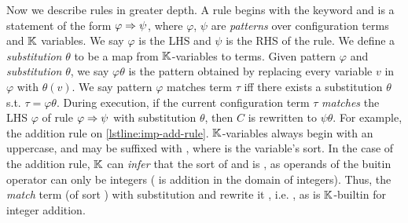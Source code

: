 Now we describe rules in greater depth.
A rule begins with the keyword 
and is a statement of the form $\varphi \Rightarrow \psi$, where
$\varphi$, $\psi$ are \emph{patterns} over configuration terms and $\mathbb{K}$ variables.
We say $\varphi$ is the LHS and $\psi$ is the RHS of the rule.
We define a \emph{substitution} $\theta$ to be a map from $\mathbb{K}$-variables to terms.
Given pattern $\varphi$ and \emph{substitution} $\theta$, we say
$\varphi\theta$ is the pattern obtained by replacing every variable $v$ in
$\varphi$ with $\theta(v)$. We say pattern $\varphi$ matches
term $\tau$ iff there exists a substitution $\theta$ s.t. $\tau = \varphi\theta$.
During execution, if the current configuration term
$\tau$ \emph{matches} the LHS $\varphi$ of rule $\varphi \Rightarrow \psi$
with substitution $\theta$, then $C$ is rewritten to $\psi\theta$.
For example, the addition rule on \autoref{lstline:imp-add-rule}.
$\mathbb{K}$-variables always begin with an uppercase, and may be suffixed with
, where  is the variable's sort. In the case
of the addition rule, $\mathbb{K}$ can \emph{infer} that the sort of
 and  is , as operands of the
buitin operator  can only be integers (
is addition in the domain of integers). Thus, the \LHS{} 
\emph{match} term  (of sort )
with substitution
 and rewrite it , i.e. , as
 is $\mathbb{K}$-builtin for integer addition.

